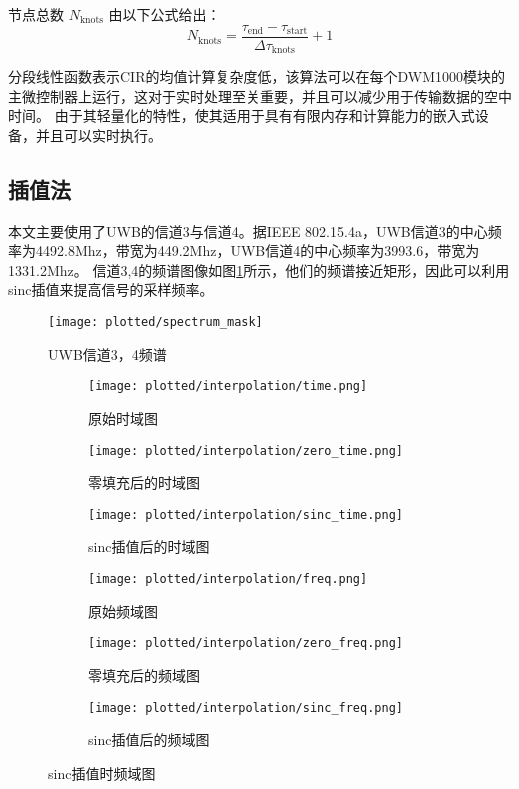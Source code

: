 节点总数 \( N_{\text{knots}} \) 由以下公式给出：
\[ N_{\text{knots}} = \frac{\tau_{\text{end}} - \tau_{\text{start}}}{\Delta \tau_{\text{knots}}} + 1 \]

分段线性函数表示CIR的均值计算复杂度低，该算法可以在每个DWM1000模块的主微控制器上运行，这对于实时处理至关重要，并且可以减少用于传输数据的空中时间。
由于其轻量化的特性，使其适用于具有有限内存和计算能力的嵌入式设备，并且可以实时执行。

\subsection{插值法}
本文主要使用了UWB的信道3与信道4。据IEEE 802.15.4a，UWB信道3的中心频率为4492.8Mhz，带宽为449.2Mhz，UWB信道4的中心频率为3993.6，带宽为1331.2Mhz。
信道3,4的频谱图像如图\ref{fig:spectrum_mask}所示，他们的频谱接近矩形，因此可以利用sinc插值来提高信号的采样频率。
\begin{figure}[htbp]
    \centering
    \texttt{[image: plotted/spectrum\_mask]}
    \caption{\label{fig:spectrum_mask}UWB信道3，4频谱}
\end{figure}

\begin{figure}[htbp]
    \centering
    \begin{subfigure}{0.33\textwidth}
        \centering
        \texttt{[image: plotted/interpolation/time.png]}
        \caption{\label{fig:time}原始时域图}
    \end{subfigure}%
    \begin{subfigure}{0.33\textwidth}
        \centering
        \texttt{[image: plotted/interpolation/zero\_time.png]}
        \caption{\label{fig:zero_time}零填充后的时域图}
    \end{subfigure}
    \begin{subfigure}{0.33\textwidth}
        \centering
        \texttt{[image: plotted/interpolation/sinc\_time.png]}
        \caption{\label{fig:sinc_time}sinc插值后的时域图}
    \end{subfigure}

    \begin{subfigure}{0.33\textwidth}
        \centering
        \texttt{[image: plotted/interpolation/freq.png]}
        \caption{\label{fig:freq}原始频域图}
    \end{subfigure}%
    \begin{subfigure}{0.33\textwidth}
        \centering
        \texttt{[image: plotted/interpolation/zero\_freq.png]}
        \caption{\label{fig:zero_freq}零填充后的频域图}
    \end{subfigure}
    \begin{subfigure}{0.33\textwidth}
        \centering
        \texttt{[image: plotted/interpolation/sinc\_freq.png]}
        \caption{\label{fig:sinc_freq}sinc插值后的频域图}
    \end{subfigure}
    \caption{sinc插值时频域图}
    \label{fig:interpolation}
\end{figure}

